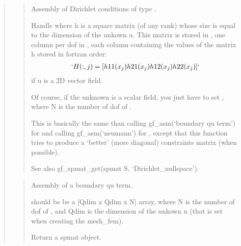\documentclass[a4paper,11pt,english]{sphinxmanual}
\begin{document}
\begin{quote}
\begin{quote}
Assembly of Dirichlet conditions of type .

Handle  where h is a square matrix (of any rank) whose
size is equal to the dimension of the unkown u. This matrix is
stored in , one column per dof in , each column containing
the values of the matrix h stored in fortran order:
\begin{equation*}
\begin{split}`H(:,j) = [h11(x_j) h21(x_j) h12(x_j) h22(x_j)]`\end{split}
\end{equation*}
if u is a 2D vector field.

Of course, if the unknown is a scalar field, you just have to set
, where N is the number of dof of .

This is basically the same than calling gf\_asm(‘boundary qu term’)
for  and calling gf\_asm(‘neumann’) for , except that this
function tries to produce a ‘better’ (more diagonal) constraints
matrix (when possible).

See also gf\_spmat\_get(spmat S, ‘Dirichlet\_nullspace’).
\end{quote}

\begin{quote}

Assembly of a boundary qu term.

 should be be a {[}Qdim x Qdim x N{]} array, where N is the number
of dof of , and Qdim is the dimension of the unkown u (that
is set when creating the mesh\_fem).

Return a spmat object.
\end{quote}

\begin{quote}


\end{quote}
\end{quote}
\end{document}
